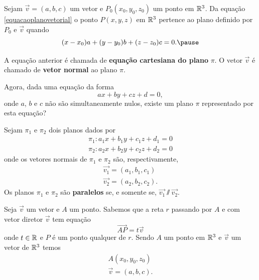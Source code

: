\documentclass{beamer}
\begin{document}
\begin{frame}
    \begin{definicao}
        Sejam $\vec{v} = (a,b,c)$ um vetor e \pause $P_0(x_0, y_0, z_0)$ \pause um ponto em $\mathbb{R}^3$. \pause Da equação
        \eqref{equacaoplanovetorial} \pause o ponto $P(x, y, z)$ em $\mathbb{R}^3$ \pause pertence ao plano definido por $P_0$ \pause e $\vec{v}$ \pause quando\pause
        \begin{equation}\label{equacaoplano}
            (x - x_0)a + (y - y_0)b + (z - z_0)c = 0.\pause
        \end{equation}

        A equação anterior é chamada de \textbf{equação cartesiana do plano} $\pi$. \pause O vetor $\vec{v}$ \pause é chamado de \textbf{vetor normal} \pause ao plano $\pi$.
    \end{definicao}
\end{frame}

\begin{frame}
    Agora, dada uma equação da forma
    \[
        ax + by + cz + d = 0,
    \]\pause
    onde $a$, $b$ e $c$ \pause não são simultaneamente nulos, \pause existe um plano $\pi$ representado por esta equação?
\end{frame}

\begin{frame}
    \begin{definicao}
        Sejam $\pi_1$ e $\pi_2$ \pause dois planos dados por\pause
        \begin{align*}
            \pi_1 : a_1x + b_1y + c_1z + d_1 = 0 \\
            \pi_2 : a_2x + b_2y + c_2z + d_2 = 0
        \end{align*}\pause
        onde os vetores normais de $\pi_1$ e $\pi_2$ \pause são, respectivamente,\pause
        \begin{align*}
            \vec{v_1} = (a_1, b_1, c_1) \\
            \vec{v_2} = (a_2, b_2, c_2).
        \end{align*}\pause
        Os planos $\pi_1$ e $\pi_2$ são \textbf{paralelos} \pause se, e somente se, \pause $\vec{v_1} \varparallel\vec{v_2}$.
    \end{definicao}
\end{frame}

\begin{frame}
    Seja $\vec{v}$ um vetor \pause e $A$ um ponto. \pause Sabemos que a reta $r$ \pause passando por $A$ \pause e com vetor diretor $\vec{v}$ \pause tem
    equação\pause
    \begin{equation}
        \vec{AP} = t\vec{v}
    \end{equation}\pause
    onde $t \in \mathbb{R}$ \pause e $P$ é um ponto qualquer de $r$. \pause Sendo $A$ um ponto em $\mathbb{R}^3$ \pause e $\vec{v}$ um vetor de $\mathbb{R}^3$ \pause
    temos\pause
    \begin{align*}
        A(x_0, y_0, z_0) \\
        \vec{v} = (a, b, c).
    \end{align*}
\end{frame}
\end{document}
